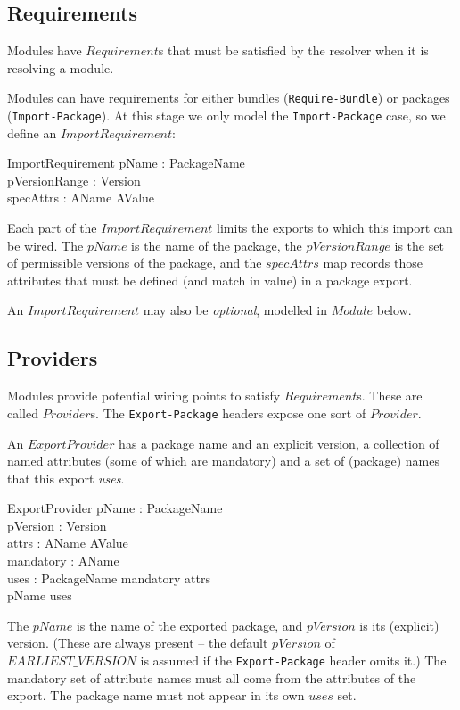 \documentclass[a4paper,12pt]{article}
\begin{document}
\subsection{Requirements}
Modules have $Requirement$s that must be satisfied by the resolver when it is resolving a module.

Modules can have requirements for either bundles ({\tt Require-Bundle}) or packages ({\tt Import-Package}). At this stage we only model the {\tt Import-Package} case, so we define an $ImportRequirement$:
\begin{schema}{ImportRequirement}
 	pName : PackageName \\
 	pVersionRange : \power Version \\
 	specAttrs : AName \pfun AValue \\
\end{schema}
Each part of the $ImportRequirement$ limits the exports to which this import can be wired. The $pName$ is the name of the package, the $pVersionRange$ is the set of permissible versions of the package, and the $specAttrs$ map records those attributes that must be defined (and match in value) in a package export.

An $ImportRequirement$ may also be {\it optional}, modelled in $Module$ below.

\subsection{Providers}

Modules provide potential wiring points to satisfy $Requirement$s. These are called $Provider$s. The {\tt Export-Package} headers expose one sort of $Provider$.

An $ExportProvider$ has a package name and an explicit version, a collection of named attributes (some of which are mandatory) and a set of (package) names that this export {\it uses}. 
\begin{schema}{ExportProvider}
	pName : PackageName \\
	pVersion : Version \\
	attrs : AName \pfun AValue \\
	mandatory : \power AName \\
	uses : \power PackageName
\where
	mandatory \subseteq \dom attrs \\
	pName \notin uses
\end{schema}
The $pName$ is the name of the exported package, and $pVersion$ is its (explicit) version. (These are always present -- the default $pVersion$ of $EARLIEST\_VERSION$ is assumed if the {\tt Export-Package} header omits it.) The mandatory set of attribute names must all come from the attributes of the export. The package name must not appear in its own $uses$ set.
\end{document}
